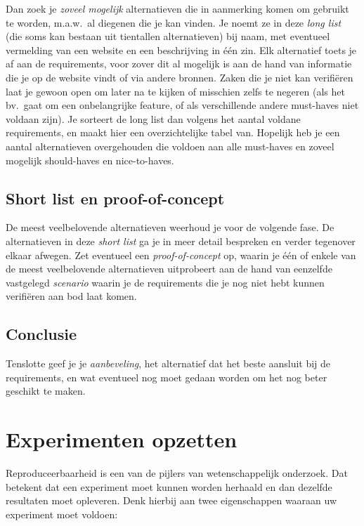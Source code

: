 Dan zoek je \emph{zoveel mogelijk} alternatieven die in aanmerking komen om gebruikt te worden, m.a.w.~al diegenen die je kan vinden. Je noemt ze in deze \emph{long list} (die soms kan bestaan uit tientallen alternatieven) bij naam, met eventueel vermelding van een website en een beschrijving in één zin. Elk alternatief toets je af aan de requirements, voor zover dit al mogelijk is aan de hand van informatie die je op de website vindt of via andere bronnen. Zaken die je niet kan verifiëren laat je gewoon open om later na te kijken of misschien zelfs te negeren (als het bv.~gaat om een onbelangrijke feature, of als verschillende andere must-haves niet voldaan zijn). Je sorteert de long list dan volgens het aantal voldane requirements, en maakt hier een overzichtelijke tabel van. Hopelijk heb je een aantal alternatieven overgehouden die voldoen aan alle must-haves en zoveel mogelijk should-haves en nice-to-haves.

\subsection{Short list en proof-of-concept}
\label{ssec:short-list-poc}

 De meest veelbelovende alternatieven weerhoud je voor de volgende fase. De alternatieven in deze \emph{short list} ga je in meer detail bespreken en verder tegenover elkaar afwegen. Zet eventueel een \emph{proof-of-concept} op, waarin je één of enkele van de meest veelbelovende alternatieven uitprobeert aan de hand van eenzelfde vastgelegd \emph{scenario} waarin je de requirements die je nog niet hebt kunnen verifiëren aan bod laat komen.

\subsection{Conclusie}
\label{ssec:vgl-studie-conclusie}

Tenslotte geef je je \emph{aanbeveling}, het alternatief dat het beste aansluit bij de requirements, en wat eventueel nog moet gedaan worden om het nog beter geschikt te maken.

\section{Experimenten opzetten}
\label{sec:experimenten-opzetten}
Reproduceerbaarheid is een van de pijlers van wetenschappelijk onderzoek. Dat betekent dat een experiment moet kunnen worden herhaald en dan dezelfde resultaten moet opleveren. Denk hierbij aan twee eigenschappen waaraan uw experiment moet voldoen:

